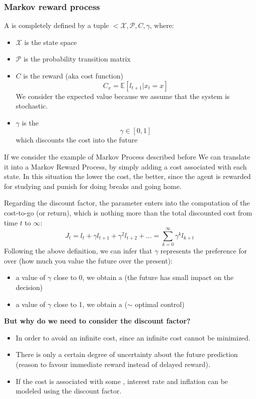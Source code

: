 \subsubsection{Markov reward process}
A  is completely defined by a tuple $<\mathcal{X}, \mathcal{P}, C, \gamma$, where:
\begin{itemize}
\item $\mathcal{X}$ is the state space
\item $\mathcal{P}$ is the probability transition matrix
\item $C$ is the reward (aka cost function)
\[C_x = \mathbb{E}[l_{t+1}|x_t = x]\]
We consider the expected value because we assume that the system is stochastic.
\item $\gamma$ is the 
\[\gamma \in [0,1]\]
which discounts the cost into the future
\end{itemize}
If we consider the example of Markov Process described before
We can translate it into a Markov Reward Process, by simply adding a cost associated with each state. In this situation the lower the cost, the better, since the agent is rewarded for studying and punish for doing breaks and going home.

Regarding the discount factor, the parameter enters into the computation of the cost-to-go (or return), which is nothing more than the total discounted cost from time $t$ to $\infty$:
\[J_t = l_t + \gamma l_{t+1} + \gamma^2 l_{t+2} + ... = \sum_{k=0}^{\infty} \gamma^{k}l_{k+t}\]
Following the above definition, we can infer that $\gamma$ represents the preference for  over  (how much you value the future over the present):
\begin{itemize}
\item a value of $\gamma$ close to 0, we obtain a  (the future has small impact on the decision)
\item a value of $\gamma$ close to 1, we obtain a  ($\sim$ optimal control)
\end{itemize}

\begin{center}
\textbf{But why do we need to consider the discount factor?}
\end{center}
\begin{itemize}
\item In order to avoid an infinite cost, since an infinite cost cannot be minimized.
\item There is only a certain degree of uncertainty about the future prediction (reason to favour immediate reward instead of delayed reward).
\item If the cost is associated with some , interest rate and inflation can be modeled using the discount factor. 
\end{itemize}

